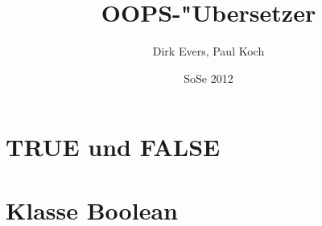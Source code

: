 \documentclass[11pt,a4paper,oneside]{report}
\begin{document}
\title{OOPS-"Ubersetzer}
\date{SoSe 2012}
\author{Dirk Evers, Paul Koch}

\maketitle

\tableofcontents

\chapter{TRUE und FALSE}


\chapter{Klasse Boolean}

\end{document}
